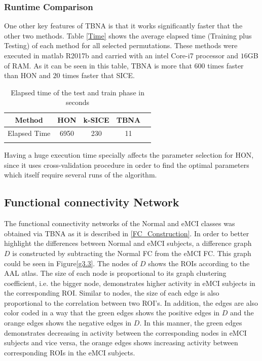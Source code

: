 \documentclass[journal]{IEEEtran}
\begin{document}
{	\subsubsection{Runtime Comparison}
	One other key features of TBNA is that it works significantly faster that the other two methods. Table \eqref{Time} shows the average elapsed time (Training plus Testing) of each method for all selected permutations. These methods were executed in matlab R2017b and carried with an intel Core-i7 processor and $16$GB of RAM. As it can be seen in this table, TBNA is more that $600$ times faster than HON and $20$ times faster that SICE.   
	\begin{table}
		\begin{center}
			\caption{Elapsed time of the test and train phase in seconds}
			\begin{tabular}{@{}c*{4}{c}}
				\hline\hline
				Method& HON & k-SICE& TBNA  
				\\
				\hline
				Elapsed Time  &6950& 230 & 11 
				\\
				\hline\hline
				\label{Time}
			\end{tabular}
		\end{center}
	\end{table}
	Having a huge execution time specially affects the parameter selection for HON, since it uses cross-validation procedure in order to find the optimal parameters which itself require several  runs of the algorithm. 
	
	
	
	
	\subsection{Functional connectivity Network}
	The functional connectivity networks of the Normal and eMCI classes was obtained via TBNA as it is described in \eqref{FC_Construction}.
	In order to better highlight the differences between Normal and eMCI subjects, a difference graph $D$ is constructed by subtracting the Normal FC from the eMCI FC. This graph could be seen in Figure\eqref{g3.3}. 
	The nodes of $D$ shows the ROIs according to the AAL atlas. The size of each node is proportional to its graph clustering coefficient, i.e. the bigger node, demonstrates higher activity in eMCI subjects in the corresponding ROI. 
	Similar to nodes, the size of each edge is also proportional to the correlation between two ROI's. In addition, the edges are also color coded in a way that the green edges shows the positive edges in $D$ and the orange edges shows the negative edges in $D$. In this manner, the green edges demonstrates decreasing in activity between the corresponding nodes in eMCI subjects and vice versa, the orange edges shows increasing activity between corresponding ROIs in the eMCI subjects.   
	
}
\end{document}
